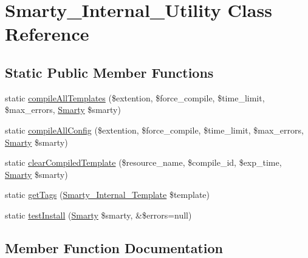 \hypertarget{class_smarty___internal___utility}{}\section{Smarty\+\_\+\+Internal\+\_\+\+Utility Class Reference}
\label{class_smarty___internal___utility}
\subsection*{Static Public Member Functions}
\begin{DoxyCompactItemize}
\item 
static \hyperlink{class_smarty___internal___utility_a65e177220d19695e61f74b972160a333}{compile\+All\+Templates} (\$extention, \$force\+\_\+compile, \$time\+\_\+limit, \$max\+\_\+errors, \hyperlink{class_smarty}{Smarty} \$smarty)
\item 
static \hyperlink{class_smarty___internal___utility_aff02fcfd8ba823768195511eb3c7d658}{compile\+All\+Config} (\$extention, \$force\+\_\+compile, \$time\+\_\+limit, \$max\+\_\+errors, \hyperlink{class_smarty}{Smarty} \$smarty)
\item 
static \hyperlink{class_smarty___internal___utility_a674581f5d9ff1064bb04e1e2e6f26812}{clear\+Compiled\+Template} (\$resource\+\_\+name, \$compile\+\_\+id, \$exp\+\_\+time, \hyperlink{class_smarty}{Smarty} \$smarty)
\item 
static \hyperlink{class_smarty___internal___utility_ac812e48bdf84b0e5a81f25881b1f7a64}{get\+Tags} (\hyperlink{class_smarty___internal___template}{Smarty\+\_\+\+Internal\+\_\+\+Template} \$template)
\item 
static \hyperlink{class_smarty___internal___utility_a70346af936b76aa358610fdc785324f5}{test\+Install} (\hyperlink{class_smarty}{Smarty} \$smarty, \&\$errors=null)
\end{DoxyCompactItemize}


\subsection{Member Function Documentation}
\hypertarget{class_smarty___internal___utility_a674581f5d9ff1064bb04e1e2e6f26812}{}
